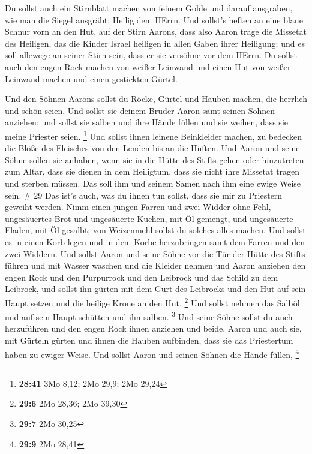  Du sollst auch ein Stirnblatt machen von feinem Golde und
darauf ausgraben, wie man die Siegel ausgräbt: Heilig dem HErrn.
 Und sollst's heften an eine blaue Schnur vorn an den Hut,
 auf der Stirn Aarons, dass also Aaron trage die Missetat
des Heiligen, das die Kinder Israel heiligen in allen Gaben ihrer
Heiligung; und es soll allewege an seiner Stirn sein, dass er sie
versöhne vor dem HErrn.  Du sollst auch den engen Rock
machen von weißer Leinwand und einen Hut von weißer Leinwand machen und
einen gestickten Gürtel.

 Und den Söhnen Aarons sollst du Röcke, Gürtel und Hauben
machen, die herrlich und schön seien.  Und sollst sie
deinem Bruder Aaron samt seinen Söhnen anziehen; und sollst sie salben
und ihre Hände füllen und sie weihen, dass sie meine Priester seien.
\footnote{\textbf{28:41} 3Mo 8,12; 2Mo 29,9; 2Mo 29,24} 
Und sollst ihnen leinene Beinkleider machen, zu bedecken die Blöße des
Fleisches von den Lenden bis an die Hüften.  Und Aaron und
seine Söhne sollen sie anhaben, wenn sie in die Hütte des Stifts gehen
oder hinzutreten zum Altar, dass sie dienen in dem Heiligtum, dass sie
nicht ihre Missetat tragen und sterben müssen. Das soll ihm und seinem
Samen nach ihm eine ewige Weise sein. \# 29  Das ist's auch,
was du ihnen tun sollst, dass sie mir zu Priestern geweiht werden. Nimm
einen jungen Farren und zwei Widder ohne Fehl,  ungesäuertes
Brot und ungesäuerte Kuchen, mit Öl gemengt, und ungesäuerte Fladen, mit
Öl gesalbt; von Weizenmehl sollst du solches alles machen. 
Und sollst es in einen Korb legen und in dem Korbe herzubringen samt dem
Farren und den zwei Widdern.  Und sollst Aaron und seine
Söhne vor die Tür der Hütte des Stifts führen und mit Wasser waschen
 und die Kleider nehmen und Aaron anziehen den engen Rock
und den Purpurrock und den Leibrock und das Schild zu dem Leibrock, und
sollst ihn gürten mit dem Gurt des Leibrocks  und den Hut
auf sein Haupt setzen und die heilige Krone an den Hut. \footnote{\textbf{29:6}
  2Mo 28,36; 2Mo 39,30}  Und sollst nehmen das Salböl und
auf sein Haupt schütten und ihn salben. \footnote{\textbf{29:7} 2Mo
  30,25}  Und seine Söhne sollst du auch herzuführen und den
engen Rock ihnen anziehen  und beide, Aaron und auch sie,
mit Gürteln gürten und ihnen die Hauben aufbinden, dass sie das
Priestertum haben zu ewiger Weise. Und sollst Aaron und seinen Söhnen
die Hände füllen, \footnote{\textbf{29:9} 2Mo 28,41}

